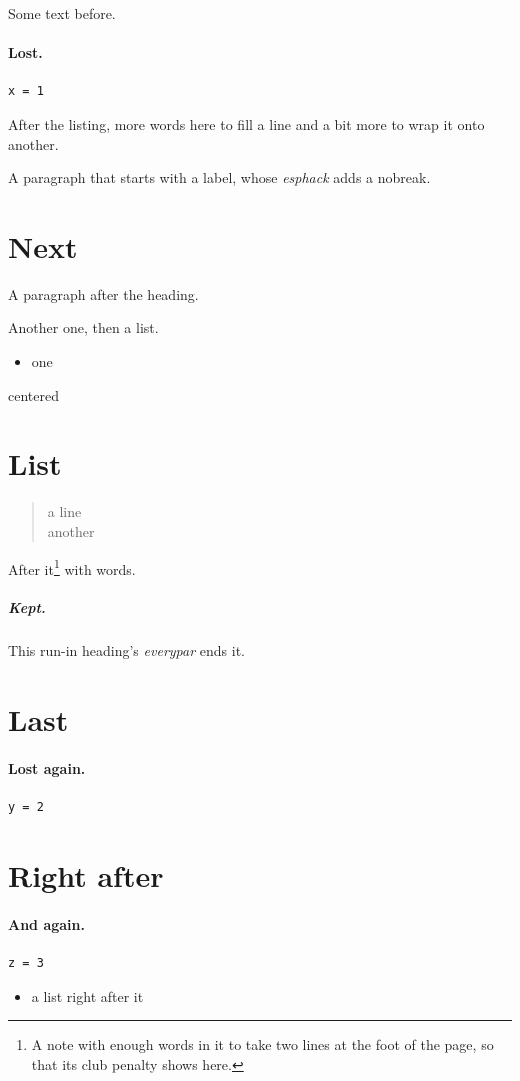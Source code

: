 \documentclass{article}
\begin{document}
Some text before.

\paragraph{Lost.}
\begin{lstlisting}[caption={A caption},label=lst:a]
x = 1
\end{lstlisting}
After the listing, more words here to fill a line and a bit more to wrap it onto another.

\label{p:a}A paragraph that starts with a label, whose \textit{esphack} adds a nobreak.

\section{Next}
A paragraph after the heading.

Another one, then a list.
\begin{itemize}
\item one
\end{itemize}

\begin{center}
centered
\end{center}

\section{List}

\begin{verse}
a line \\
another
\end{verse}
After it\footnote{A note with enough words in it to take two lines at the foot of the page, so that its club penalty shows here.} with words.

\subparagraph{Kept.} This run-in heading's \textit{everypar} ends it.

\section{Last}
\paragraph{Lost again.}
\begin{lstlisting}
y = 2
\end{lstlisting}
\section{Right after}
\paragraph{And again.}
\begin{lstlisting}
z = 3
\end{lstlisting}
\begin{itemize}
\item a list right after it
\end{itemize}
\end{document}
